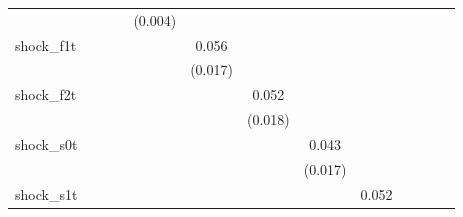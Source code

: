 {\begin{tabular}{l*{12}{c}}
            &                     &                     &                     &     (0.004)         &                     &                     &                     &                     &                     &                     &                     &                     \\
\addlinespace
shock\_f1t   &                     &                     &                     &                     &       0.056\sym{***}&                     &                     &                     &                     &                     &                     &                     \\
            &                     &                     &                     &                     &     (0.017)         &                     &                     &                     &                     &                     &                     &                     \\
\addlinespace
shock\_f2t   &                     &                     &                     &                     &                     &       0.052\sym{***}&                     &                     &                     &                     &                     &                     \\
            &                     &                     &                     &                     &                     &     (0.018)         &                     &                     &                     &                     &                     &                     \\
\addlinespace
shock\_s0t   &                     &                     &                     &                     &                     &                     &       0.043\sym{**} &                     &                     &                     &                     &                     \\
            &                     &                     &                     &                     &                     &                     &     (0.017)         &                     &                     &                     &                     &                     \\
\addlinespace
shock\_s1t   &                     &                     &                     &                     &                     &                     &                     &       0.052\sym{***}&                     &                     &                     &                     \\

\end{tabular}}
